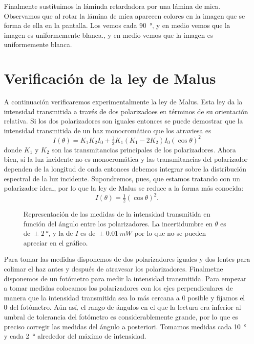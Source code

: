 \documentclass[12pt]{article}
\numberwithin{table}{section}
\numberwithin{figure}{section}
\numberwithin{equation}{section}
\newcommand{\unc}[2]{\ensuremath{{}\pm \SI{#1}{#2}}}
\begin{document}
Finalmente sustituimos la láminda retardadora por una lámina de mica. Observamos que al rotar la lámina de mica aparecen colores en la imagen que se forma de ella en la pantalla. Los vemos cada \SI{90}{\degree}, y en medio vemos que la imagen es uniformemente blanca., y en medio vemos que la imagen es uniformemente blanca.

\section{Verificación de la ley de Malus}
A continuación verificaremos experimentalmente la ley de Malus. Esta ley da la intensidad transmitida a través de dos polarizadoes en términos de su orientación relativa. Si los dos polarizadores son iguales entonces se puede demostrar que la intensidad transmitida de un haz monocromático que los atraviesa es
\begin{equation*}
	I(\theta) = K_1K_2I_0 + \tfrac{1}{2}K_1(K_1 - 2K_2)I_0 (\cos{\theta})^2 
\end{equation*}
donde \( K_1 \) y \( K_2 \) son las transmitancias principales de los polarizadores. Ahora bien, si la luz incidente no es monocromática y las transmitancias del polarizador dependen de la longitud de onda entonces debemos integrar sobre la distribución espectral de la luz incidente. Supondremos, pues, que estamos tratando con un polarizador ideal, por lo que la ley de Malus se reduce a la forma más conocida:
\begin{equation} \label{eqn:malus}
	I(\theta) = \tfrac{1}{2} (\cos{\theta})^2.
\end{equation}

\begin{figure}[htb]
	\centering \small \sffamily
	
	\caption{Representación de las medidas de la intensidad transmitida en función del ángulo entre los polarizadores. La incertidumbre en \( \theta \) es de \unc{2}{\degree}, y la de \( I \) es de \unc{0.01}{mW} por lo que no se pueden apreciar en el gráfico.}
	\label{fig:malus-1}
\end{figure}

Para tomar las medidas disponemos de dos polarizadores iguales y dos lentes para colimar el haz antes y después de atravesar los polarizadores. Finalmetne disponemos de un fotómetro para medir la intensidad transmitida. Para empezar a tomar medidas colocamos los polarizadores con los ejes perpendiculares de manera que la intensidad transmitida sea lo más cercana a 0 posible y fijamos el 0 del fotómetro. Aún así, el rango de ángulos en el que la lectura era inferior al umbral de tolerancia del fotómetro es considerablemente grande, por lo que es preciso corregir las medidas del ángulo a posteriori. Tomamos medidas cada \SI{10}{\degree} y cada \SI{2}{\degree} alrededor del máximo de intensidad. 
\end{document}
